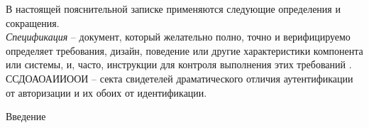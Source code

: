 \label{sec:definitions}

В настоящей пояснительной записке применяются следующие определения и сокращения.
\\

\emph{Спецификация} -- документ, который желательно полно, точно и верифицируемо определяет требования, дизайн, поведение или другие характеристики компонента или системы, и, часто, инструкции для контроля выполнения этих требований \cite{istqb_specification}.
\\

ССДОАОАИИООИ -- секта свидетелей драматического отличия аутентификации от авторизации и их обоих от идентификации.


\label{sec:introduction}

Введение
